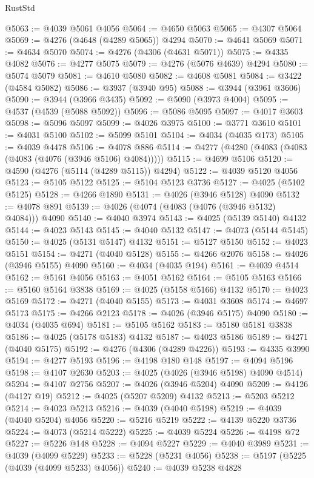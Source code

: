\begin{lexlean}{RustStd}
\begin{coremodule}
@5063 := @4039 @5061 @4056
@5064 := @4650 @5063
@5065 := @4307 @5064
@5069 := @4276 (@4648 (@4289 @5065)) @4294
@5070 := @4641 @5069
@5071 := @4634 @5070
@5074 := @4276 (@4306 (@4631 @5071))
@5075 := @4335 @4082
@5076 := @4277 @5075
@5079 := @4276 (@5076 @4639) @4294
@5080 := @5074 @5079
@5081 := @4610 @5080
@5082 := @4608 @5081
@5084 := @3422 (@4584 @5082)
@5086 := @3937 (@3940 @95)
@5088 := @3944 (@3961 @3606)
@5090 := @3944 (@3966 @3435)
@5092 := @5090 (@3973 @4004)
@5095 := @4537 (@4539 (@5088 @5092))
@5096 := @5086 @5095
@5097 := @4017 @3603
@5098 := @5096 @5097
@5099 := @4026 @3975
@5100 := @3771 @3610
@5101 := @4031 @5100
@5102 := @5099 @5101
@5104 := @4034 (@4035 @173)
@5105 := @4039 @4478
@5106 := @4078 @886
@5114 := @4277 (@4280 (@4083 (@4083 (@4083 (@4076 (@3946 @5106) @4084)))))
@5115 := @4699 @5106
@5120 := @4590 (@4276 (@5114 (@4289 @5115)) @4294)
@5122 := @4039 @5120 @4056
@5123 := @5105 @5122
@5125 := @5104 @5123 @3736
@5127 := @4025 (@5102 @5125)
@5128 := @4266 @1890
@5131 := @4026 (@3946 @5128) @4090
@5132 := @4078 @891
@5139 := @4026 (@4074 (@4083 (@4076 (@3946 @5132) @4084))) @4090
@5140 := @4040 @3974
@5143 := @4025 (@5139 @5140) @4132
@5144 := @4023 @5143
@5145 := @4040 @5132
@5147 := @4073 (@5144 @5145)
@5150 := @4025 (@5131 @5147) @4132
@5151 := @5127 @5150
@5152 := @4023 @5151
@5154 := @4271 (@4040 @5128)
@5155 := @4266 @2076
@5158 := @4026 (@3946 @5155) @4090
@5160 := @4034 (@4035 @194)
@5161 := @4039 @4514
@5162 := @5161 @4056
@5163 := @4051 @5162
@5164 := @5105 @5163
@5166 := @5160 @5164 @3838
@5169 := @4025 (@5158 @5166) @4132
@5170 := @4023 @5169
@5172 := @4271 (@4040 @5155)
@5173 := @4031 @3608
@5174 := @4697 @5173
@5175 := @4266 @2123
@5178 := @4026 (@3946 @5175) @4090
@5180 := @4034 (@4035 @694)
@5181 := @5105 @5162
@5183 := @5180 @5181 @3838
@5186 := @4025 (@5178 @5183) @4132
@5187 := @4023 @5186
@5189 := @4271 (@4040 @5175)
@5192 := @4276 (@4306 (@4289 @4226))
@5193 := @4335 @3990
@5194 := @4277 @5193
@5196 := @4198 @180 @148
@5197 := @4094 @5196
@5198 := @4107 @2630
@5203 := @4025 (@4026 (@3946 @5198) @4090 @4514)
@5204 := @4107 @2756
@5207 := @4026 (@3946 @5204) @4090
@5209 := @4126 (@4127 @19)
@5212 := @4025 (@5207 @5209) @4132
@5213 := @5203 @5212
@5214 := @4023 @5213
@5216 := @4039 (@4040 @5198)
@5219 := @4039 (@4040 @5204) @4056
@5220 := @5216 @5219
@5222 := @4139 @5220 @3736
@5224 := @4073 (@5214 @5222)
@5225 := @4039 @5224
@5226 := @4198 @72
@5227 := @5226 @148
@5228 := @4094 @5227
@5229 := @4040 @3989
@5231 := @4039 (@4099 @5229)
@5233 := @5228 (@5231 @4056)
@5238 := @5197 (@5225 (@4039 (@4099 @5233) @4056))
@5240 := @4039 @5238 @4828

\end{coremodule}
\end{lexlean}
